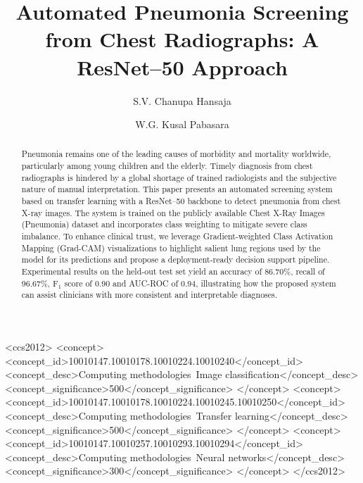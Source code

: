 \documentclass[sigconf]{acmart}
\begin{document}
\title{Automated Pneumonia Screening from Chest Radiographs: A ResNet--50 Approach}

\author{S.V. Chanupa Hansaja}

\author{W.G. Kusal Pabasara}

\renewcommand{\shortauthors}{Hansaja and Pabasara}

\begin{abstract}
Pneumonia remains one of the leading causes of morbidity and mortality worldwide, particularly among young children and the elderly. Timely diagnosis from chest radiographs is hindered by a global shortage of trained radiologists and the subjective nature of manual interpretation. This paper presents an automated screening system based on transfer learning with a ResNet--50 backbone to detect pneumonia from chest X-ray images. The system is trained on the publicly available Chest X-Ray Images (Pneumonia) dataset and incorporates class weighting to mitigate severe class imbalance. To enhance clinical trust, we leverage Gradient-weighted Class Activation Mapping (Grad-CAM) visualizations to highlight salient lung regions used by the model for its predictions and propose a deployment-ready decision support pipeline. Experimental results on the held-out test set yield an accuracy of 86.70\%, recall of 96.67\%, F$_1$ score of 0.90 and AUC-ROC of 0.94, illustrating how the proposed system can assist clinicians with more consistent and interpretable diagnoses.
\end{abstract}


\begin{CCSXML}
<ccs2012>
<concept>
<concept_id>10010147.10010178.10010224.10010240</concept_id>
<concept_desc>Computing methodologies~Image classification</concept_desc>
<concept_significance>500</concept_significance>
</concept>
<concept>
<concept_id>10010147.10010178.10010224.10010245.10010250</concept_id>
<concept_desc>Computing methodologies~Transfer learning</concept_desc>
<concept_significance>500</concept_significance>
</concept>
<concept>
<concept_id>10010147.10010257.10010293.10010294</concept_id>
<concept_desc>Computing methodologies~Neural networks</concept_desc>
<concept_significance>300</concept_significance>
</concept>
</ccs2012>
\end{CCSXML}
\end{document}
